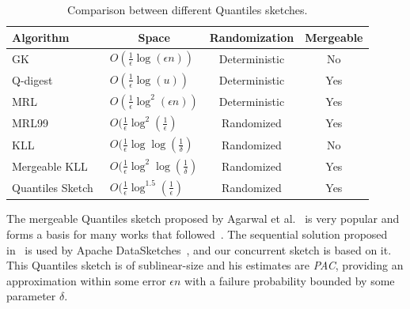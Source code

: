 \begin{table}[h]
\caption{Comparison between different Quantiles sketches.}
\label{table:compare-quantiles}
\centering
\renewcommand{\arraystretch}{1.3}
  \begin{tabular}{  l  l  c  c } \toprule
    Algorithm                                       & \multicolumn{1}{c}{Space}                                    & Randomization & Mergeable \\ \midrule
    GK~\cite{Greenwald2001_online_computation}      & $O(\frac{1}{\epsilon}\log(\epsilon n))$   & Deterministic &    No    \\ \hline
    Q-digest~\cite{Shrivastava2004Qdigest}          & $O(\frac{1}{\epsilon}\log(u))$            & Deterministic &    Yes    \\ \hline
    MRL~\cite{MankuRajagoplanLindsay1998}           & $O(\frac{1}{\epsilon}\log^2(\epsilon n))$   & Deterministic &    Yes    \\ \hline
    MRL99~\cite{MankuRajagoplanLindsay1999}         & $O(\frac{1}{\epsilon}\log^2(\frac{1}{\epsilon})$   & Randomized &    Yes    \\ \hline
    KLL~\cite{KarninKevinLiberty2016}               & $O(\frac{1}{\epsilon}\log\log(\frac{1}{\delta})$   & Randomized &    No    \\ \hline
    Mergeable KLL~\cite{KarninKevinLiberty2016}     & $O(\frac{1}{\epsilon}\log^2\log(\frac{1}{\delta})$   & Randomized &    Yes    \\ \hline
    Quantiles Sketch~\cite{mergeables_summaries}    & $O(\frac{1}{\epsilon}\log^{1.5}(\frac{1}{\epsilon})$   & Randomized &    Yes    \\
    \bottomrule
  \end{tabular}
\end{table}


The mergeable Quantiles sketch proposed by Agarwal et al.~\cite{mergeables_summaries} is very popular and forms a basis for many works that followed~\cite{KarninKevinLiberty2016, WangLuoYiCormode2013}. The sequential solution proposed in~\cite{mergeables_summaries} is used by Apache DataSketches~\cite{DataSketches}, and our concurrent sketch is based on it. This Quantiles sketch is of sublinear-size and his estimates are \emph{\gls{PAC}}, providing an approximation within some error $\epsilon n$ with a failure probability bounded by some parameter $\delta$.


